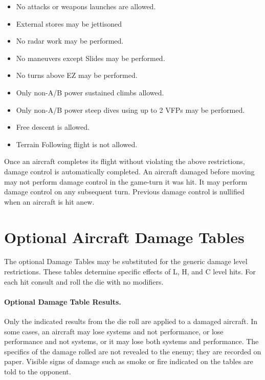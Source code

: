 \begin{advancedrules}
\begin{itemize}
    \item No attacks or weapons launches are allowed.
    \item External stores may be jettisoned
    \item No radar work may be performed.
    \item No maneuvers except Slides may be performed.
    \item No turns above EZ may be performed.
    \item Only non-A/B power sustained climbs allowed.
    \item Only non-A/B power steep dives using up to 2 VFPs may be performed.
    \item Free descent is allowed.
    \item Terrain Following flight is not allowed.
\end{itemize}

Once an aircraft completes its flight without violating the above restrictions, damage control is automatically completed. An aircraft damaged before moving may not perform damage control in the game-turn it was hit. It may perform damage control on any subsequent turn. Previous damage control is nullified when an aircraft is hit anew.

\section{Optional Aircraft Damage Tables}


The optional Damage Tables may be substituted for the generic damage level restrictions. These tables determine specific effects of L, H, and C level hits. For each hit consult  and roll the die with no modifiers. 

\paragraph{Optional Damage Table Results.} Only the indicated results from the die roll are applied to a damaged aircraft. In some cases, an aircraft may lose systems and not performance, or lose performance and not systems, or it may lose both systems and performance. The specifics of the damage rolled are not revealed to the enemy; they are recorded on paper. Visible signs of damage such as smoke or fire indicated on the tables are told to the opponent.


\end{advancedrules}
